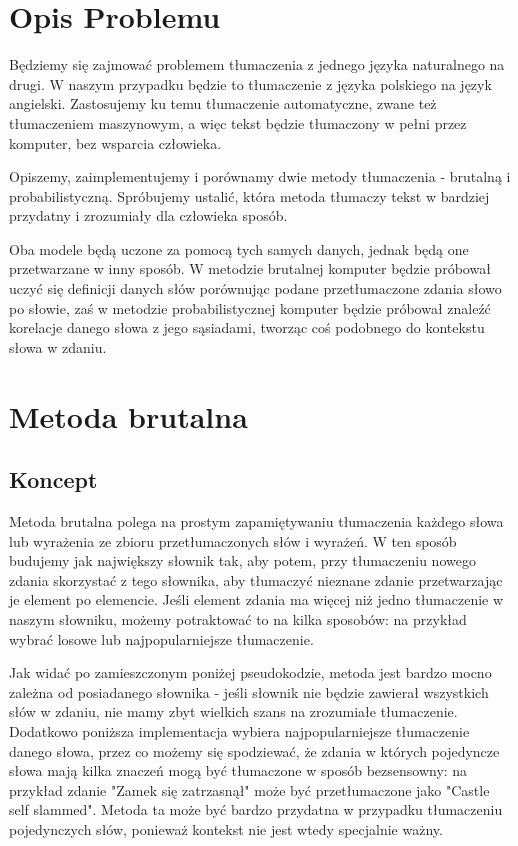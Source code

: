 \documentclass[12pt]{article}
\begin{document}

\tableofcontents

\newpage

\section{Opis Problemu}
Będziemy się zajmować problemem tłumaczenia z jednego języka naturalnego na drugi. W naszym przypadku będzie to tłumaczenie z języka polskiego na język angielski. Zastosujemy ku temu tłumaczenie automatyczne, zwane też tłumaczeniem maszynowym, a więc tekst będzie tłumaczony w pełni przez komputer, bez wsparcia człowieka. 

Opiszemy, zaimplementujemy i porównamy dwie metody tłumaczenia - brutalną i probabilistyczną. Spróbujemy ustalić, która metoda tłumaczy tekst w bardziej przydatny i zrozumiały dla człowieka sposób.

Oba modele będą uczone za pomocą tych samych danych, jednak będą one przetwarzane w inny sposób. W metodzie brutalnej komputer będzie próbował uczyć się definicji danych słów porównując podane przetłumaczone zdania słowo po słowie, zaś w metodzie probabilistycznej komputer będzie próbował znaleźć korelacje danego słowa z jego sąsiadami, tworząc coś podobnego do kontekstu słowa w zdaniu.

\section{Metoda brutalna}
\subsection{Koncept}
Metoda brutalna polega na prostym zapamiętywaniu tłumaczenia każdego słowa lub wyrażenia ze zbioru przetłumaczonych słów i wyrażeń. W ten sposób budujemy jak największy słownik tak, aby potem, przy tłumaczeniu nowego zdania skorzystać z tego słownika, aby tłumaczyć nieznane zdanie przetwarzając je element po elemencie. Jeśli element zdania ma więcej niż jedno tłumaczenie w naszym słowniku, możemy potraktować to na kilka sposobów: na przykład wybrać losowe lub najpopularniejsze tłumaczenie.

Jak widać po zamieszczonym poniżej pseudokodzie, metoda jest bardzo mocno zależna od posiadanego słownika - jeśli słownik nie będzie zawierał wszystkich słów w zdaniu, nie mamy zbyt wielkich szans na zrozumiałe tłumaczenie. Dodatkowo poniższa implementacja wybiera najpopularniejsze tłumaczenie danego słowa, przez co możemy się spodziewać, że zdania w których pojedyncze słowa mają kilka znaczeń mogą być tłumaczone w sposób bezsensowny: na przykład zdanie "Zamek się zatrzasnął" może być przetłumaczone jako "Castle self slammed". Metoda ta może być bardzo przydatna w przypadku tłumaczeniu pojedynczych słów, ponieważ kontekst nie jest wtedy specjalnie ważny. 
\end{document}

